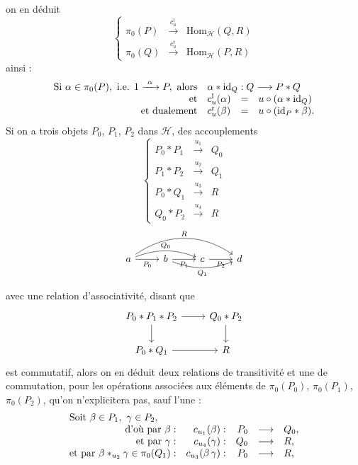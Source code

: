 \documentclass[11pt]{article}
\newcommand{\printedpage}[1]{\marginpar{\footnotesize p.~#1}}
\newcommand{\msp}[1]{\marginpar{\footnotesize [#1]}}
\begin{document}
\printedpage{4}

on en déduit
\[
\left\{
\begin{array}{lcl}
\pi_0(P) & \xrightarrow{c_u^{\mathrm{l}}} & \mathrm{Hom}_{\mathcal{H}}(Q,R)\\
\pi_0(Q) & \xrightarrow{c_u^{\mathrm{r}}} & \mathrm{Hom}_{\mathcal{H}}(P,R)
\end{array}
\right.
\]
ainsi :
\[
\begin{array}{rlcl}
\text{Si } \alpha\in\pi_0(P),\ \text{i.e. } 1\xrightarrow{\ \alpha\ }P,\ \text{alors} & \multicolumn{3}{l}{\alpha*\mathrm{id}_Q : Q\longrightarrow P*Q}\\
\text{et} & c^{\mathrm{l}}_u(\alpha) & = & u\circ(\alpha*\mathrm{id}_Q)\\
\text{et dualement} & c^{\mathrm{r}}_u(\beta) & = & u\circ(\mathrm{id}_P*\beta).
\end{array}
\]
Si on a trois objets $P_0$, $P_1$, $P_2$ dans $\mathcal{H}$, des accouplements
\[
\left\{
\begin{array}{rcl}
P_0*P_1 & \xrightarrow{u_1} & Q_0\\
P_1*P_2 & \xrightarrow{u_2} & Q_1\\
P_0*Q_1 & \xrightarrow{u_3} & R\\
Q_0*P_2 & \xrightarrow{u_4} & R
\end{array}
\right.
\]
\[
\begin{tikzcd}
a \arrow[r, "P_0"'] \arrow[rr, bend left=20, "Q_0"] \arrow[rrr, bend left=35, "R"] & b \arrow[r, "P_1"'] \arrow[rr, bend right=20, "Q_1"'] & c \arrow[r, "P_2"'] & d
\end{tikzcd}
\]

\msp{page 6}
avec une relation d'associativité, disant que
\[
\begin{tikzcd}
P_0*P_1*P_2 \arrow[r] \arrow[d] & Q_0*P_2 \arrow[d]\\
P_0*Q_1 \arrow[r] & R
\end{tikzcd}
\]
est commutatif, alors on en déduit deux relations de transitivité et une de commutation, pour les opérations associées aux éléments de $\pi_0(P_0)$, $\pi_0(P_1)$, $\pi_0(P_2)$, qu'on n'explicitera pas, sauf l'une :
\[
\begin{array}{rrrcl}
\multicolumn{5}{l}{\text{Soit } \beta\in P_1,\ \gamma\in P_2,}\\
\text{d'où par } \beta : & c_{u_1}(\beta) : & P_0 & \longrightarrow & Q_0,\\
\text{et par } \gamma : & c_{u_4}(\gamma) : & Q_0 & \longrightarrow & R,\\
\text{et par } \beta *_{u_2}\gamma\in\pi_0(Q_1) : & c_{u_3}(\beta\,\gamma) : & P_0 & \longrightarrow & R,
\end{array}
\]
\end{document}

